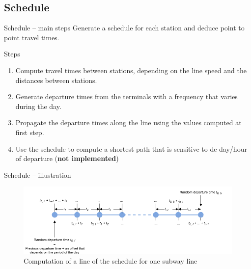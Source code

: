 \subsection{Schedule}
\begin{frame}{Schedule -- main steps}
	Generate a schedule for each station and deduce point to point travel times.
	\begin{block}{Steps}
		\begin{enumerate}
		\item Compute travel times between stations, depending on the line speed and the distances between stations.
		\item Generate departure times from the terminals with a frequency that varies during the day.
		\item Propagate the departure times along the line using the values computed at first step.
		\item Use the schedule to compute a shortest path that is sensitive to de day/hour of departure (\textbf{not implemented})
		\end{enumerate}
	\end{block} 
\end{frame}
\begin{frame}{Schedule --  illustration}
	\begin{figure}
		\centering
		\includegraphics[width=\linewidth]{images/schedule.png}
		\caption{Computation of a line of the schedule for one subway line}
	\end{figure}
\end{frame}